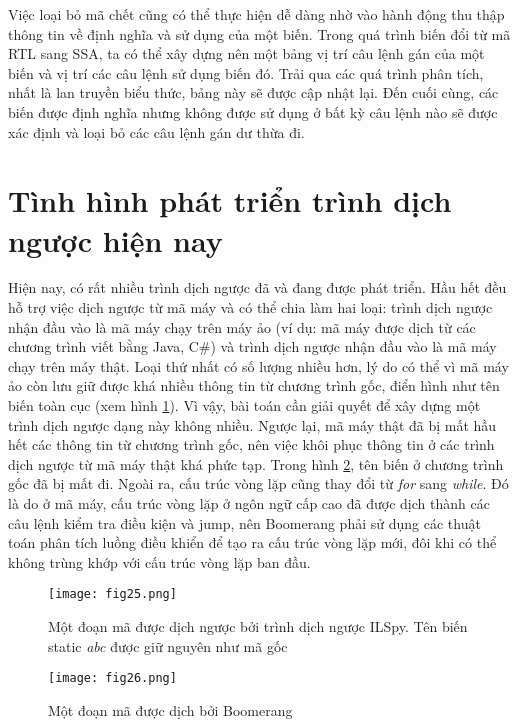 Việc loại bỏ mã chết cũng có thể thực hiện dễ dàng nhờ vào hành động thu thập thông tin về định nghĩa và sử dụng của một biến. Trong quá trình biến đổi từ mã RTL sang SSA, ta có thể xây dựng nên một bảng vị trí câu lệnh gán của một biến và vị trí các câu lệnh sử dụng biến đó. Trải qua các quá trình phân tích, nhất là lan truyền biểu thức, bảng này sẽ được cập nhật lại. Đến cuối cùng, các biến được định nghĩa nhưng không được sử dụng ở bất kỳ câu lệnh nào sẽ được xác định và loại bỏ các câu lệnh gán dư thừa đi.\\

\section{Tình hình phát triển trình dịch ngược hiện nay}

Hiện nay, có rất nhiều trình dịch ngược đã và đang được phát triển. Hầu hết đều hỗ trợ việc dịch ngược từ mã máy và có thể chia làm hai loại: trình dịch ngược nhận đầu vào là mã máy chạy trên máy ảo (ví dụ: mã máy được dịch từ các chương trình viết bằng Java, C\#) và trình dịch ngược nhận đầu vào là mã máy chạy trên máy thật. Loại thứ nhất có số lượng nhiều hơn, lý do có thể vì mã máy ảo còn lưu giữ được khá nhiều thông tin từ chương trình gốc, điển hình như tên biến toàn cục (xem hình \ref{fig:ilspy}). Vì vậy, bài toán cần giải quyết để xây dựng một trình dịch ngược dạng này không nhiều. Ngược lại, mã máy thật đã bị mất hầu hết các thông tin từ chương trình gốc, nên việc khôi phục thông tin ở các trình dịch ngược từ mã máy thật khá phức tạp. Trong hình \ref{fig:boomerang}, tên biến ở chương trình gốc đã bị mất đi. Ngoài ra, cấu trúc vòng lặp cũng thay đổi từ \textit{for} sang \textit{while}. Đó là do ở mã máy, cấu trúc vòng lặp ở ngôn ngữ cấp cao đã được dịch thành các câu lệnh kiểm tra điều kiện và jump, nên Boomerang phải sử dụng các thuật toán phân tích luồng điều khiển để tạo ra cấu trúc vòng lặp mới, đôi khi có thể không trùng khớp với cấu trúc vòng lặp ban đầu.

\begin{figure}[h]
	\centering
	\texttt{[image: fig25.png]}
	\caption{Một đoạn mã được dịch ngược bởi trình dịch ngược ILSpy. Tên biến static \textit{abc} được giữ nguyên như mã gốc}
	\label{fig:ilspy}
\end{figure}
\begin{figure}[h]
	\centering
	\texttt{[image: fig26.png]}
	\caption{Một đoạn mã được dịch bởi Boomerang}
	\label{fig:boomerang}
\end{figure}

